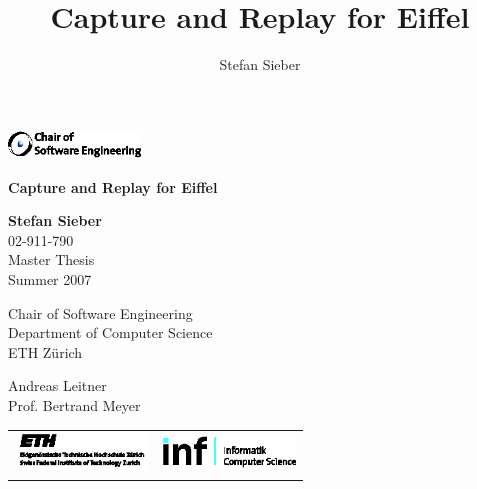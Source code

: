\documentclass[a4paper,10pt]{article}
\begin{document}
\title{Capture and Replay for Eiffel}
\author{Stefan Sieber}

\begin{titlepage}
	\begin{flushleft}
		\includegraphics[width=100pt]{illustrations/SE.png}
	\end{flushleft}

	\vskip 50pt
	\begin{center}
		\Huge \textbf{Capture and Replay for Eiffel}
	\end{center}

	\vskip 100pt
	\begin{flushright}
		\large \textbf{Stefan Sieber}\\
		\vskip 10pt
		02-911-790\\
		Master Thesis\\
		Summer 2007\\
	\end{flushright}
	
	\vskip 20pt
	\begin{flushright}
		\large Chair of Software Engineering\\
		Department of Computer Science\\
		ETH Z\"{u}rich
	\end{flushright}
		
	\vskip 20pt
	\begin{flushright}
		\large Andreas Leitner\\
		Prof. Bertrand Meyer
	\end{flushright}

	\vskip 50pt
	\begin{tabular*}{1.00\textwidth}{@{\extracolsep{\fill}}lr}
		 \includegraphics[width=100pt]{illustrations/ETH.png} &
		 \includegraphics[width=100pt]{illustrations/INF.png}
	\end{tabular*}
	\vfil
\end{titlepage}
\end{document}
